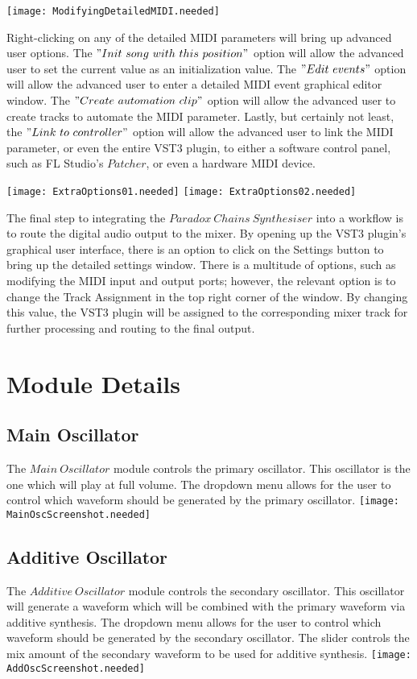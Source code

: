 \documentclass[a4paper,12pt]{report}
\begin{document}
\texttt{[image: ModifyingDetailedMIDI.needed]}

Right-clicking on any of the detailed MIDI parameters will bring up advanced user options. The $"Init\ song\ with\ this\ position"$ option will allow the advanced user to set the current value as an initialization value. The $"Edit\ events"$ option will allow the advanced user to enter a detailed MIDI event graphical editor window. The $"Create\ automation\ clip"$ option will allow the advanced user to create tracks to automate the MIDI parameter. Lastly, but certainly not least, the $"Link\ to\ controller"$ option will allow the advanced user to link the MIDI parameter, or even the entire VST3 plugin, to either a software control panel, such as FL Studio's $Patcher$, or even a hardware MIDI device.

\texttt{[image: ExtraOptions01.needed]}
\texttt{[image: ExtraOptions02.needed]}

The final step to integrating the $Paradox\ Chains\ Synthesiser$ into a workflow is to route the digital audio output to the mixer. By opening up the VST3 plugin's graphical user interface, there is an option to click on the Settings button to bring up the detailed settings window. There is a multitude of options, such as modifying the MIDI input and output ports; however, the relevant option is to change the Track Assignment in the top right corner of the window. By changing this value, the VST3 plugin will be assigned to the corresponding mixer track for further processing and routing to the final output.

\section{Module Details}
\subsection{Main Oscillator}
The $Main\ Oscillator$ module controls the primary oscillator. This oscillator is the one which will play at full volume. The dropdown menu allows for the user to control which waveform should be generated by the primary oscillator.
\texttt{[image: MainOscScreenshot.needed]}
\subsection{Additive Oscillator}
The $Additive\ Oscillator$ module controls the secondary oscillator. This oscillator will generate a waveform which will be combined with the primary waveform via additive synthesis. The dropdown menu allows for the user to control which waveform should be generated by the secondary oscillator. The slider controls the mix amount of the secondary waveform to be used for additive synthesis.
\texttt{[image: AddOscScreenshot.needed]}
\end{document}
